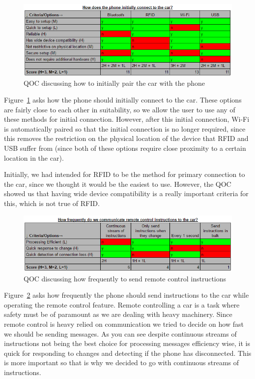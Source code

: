 \documentclass{article}
\begin{document}
\begin{figure}[H]
  \centering
  \includegraphics[scale=0.8]{qoc-app-connect}
  \caption{QOC discussing how to initially pair the car with the phone}\label{qoc-app-connect}
\end{figure}

Figure~\ref{qoc-app-connect} asks how the phone should initially connect to the car. These options are fairly close to each other in suitability, so we allow the user to use any of these methods for initial connection. However, after this initial connection, Wi-Fi is automatically paired so that the initial connection is no longer required, since this removes the restriction on the physical location of the device that RFID and USB suffer from (since both of these options require close proximity to a certain location in the car).

Initially, we had intended for RFID to be the method for primary connection to the car, since we thought it would be the easiest to use. However, the QOC showed us that having wide device compatibility is a really important criteria for this, which is not true of RFID.

\begin{figure}[H]
  \centering
  \includegraphics[scale=0.8]{qoc-app-remote}
  \caption{QOC discussing how frequently to send remote control instructions}\label{qoc-app-remote}
\end{figure}

Figure~\ref{qoc-app-remote} asks how frequently the phone should send instructions to the car while operating the remote control feature. Remote controlling a car is a task where safety must be of paramount as we are dealing with heavy machinery. Since remote control is heavy relied on communication we tried to decide on how fast we should be sending messages. As you can see despite continuous streams of instructions  not being the best choice for processing messages efficiency wise, it is quick for responding to changes and detecting if the phone has disconnected. This is more important so that is why we decided to go with continuous streams of instructions.
\end{document}
